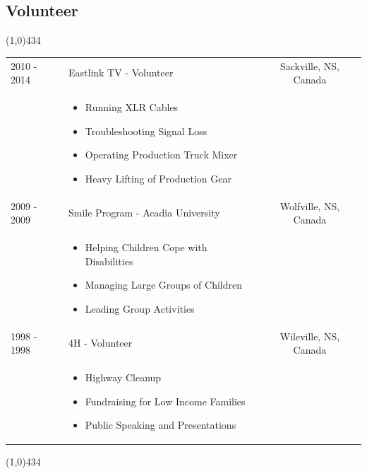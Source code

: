 \documentclass{res}
\newcommand{\frstCVcell}{2.5cm}
\begin{document}
\begin{resume}
  \pagebreak
  \section{Volunteer}
  \line(1,0){434}
  \newline
  \newline
  \begin{tabularx}{\textwidth}{p{\frstCVcell}Xc}
    2010 - 2014 & Eastlink TV - Volunteer & Sackville, NS, Canada\\
    &
    \begin{itemize}
    \item Running XLR Cables
    \item Troubleshooting Signal Loss
    \item Operating Production Truck Mixer
    \item Heavy Lifting of Production Gear
    \end{itemize}
    & \\
    2009 - 2009 & Smile Program - Acadia University & Wolfville, NS, Canada\\
    &
    \begin{itemize}
    \item Helping Children Cope with Disabilities
    \item Managing Large Groups of Children
    \item Leading Group Activities
    \end{itemize}
    & \\
    1998 - 1998 & 4H - Volunteer & Wileville, NS, Canada\\
    &
    \begin{itemize}
    \item Highway Cleanup
    \item Fundraising for Low Income Families
    \item Public Speaking and Presentations
    \end{itemize}
    & \\
  \end{tabularx}
  \newline
  \line(1,0){434}
 
  \end{resume}
  
\end{document}
